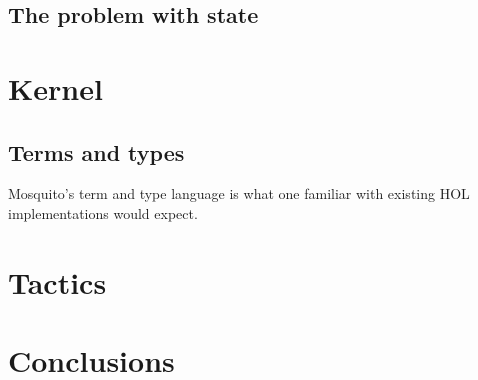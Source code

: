 \documentclass{llncs}
\begin{document}
\subsection{The problem with state}
\label{subsect.problem.with.state}

\section{Kernel}
\label{sect.kernel}

\subsection{Terms and types}
\label{subsect.terms.and.types}

Mosquito's term and type language is what one familiar with existing HOL implementations would expect.

\section{Tactics}
\label{sect.tactics}

\section{Conclusions}
\label{sect.conclusions}
\end{document}

